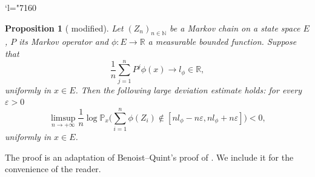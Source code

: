 \documentclass[JEP,XML,SOM,Unicode,published]{cedram}
\newcommand{\Changel}{\mathcode`l="7160}
\let\epsilon\varepsilon
\let\ts\textstyle
\theoremstyle{plain}
\newtheorem{proposition}[theorem]{Proposition}
\theoremstyle{definition}
\newcommand\R{\mathbb{R}}
\newcommand\p{\mathbb{P}}
\newcommand\N{\mathbb{N}}
\begin{document}
\Changel
\begin{proposition}[{\cite[Prop.\,3.1]{BQ.CLT} modified}]\label{proposition.deviations.MC}
Let $(Z_n)_{n\in \N}$ be a Markov chain on a state space $E$, $P$ its Markov operator and $\phi: E\to \R$ a measurable bounded function. Suppose that\vspace*{-3pt}
\begin{equation}\label{uniform}\frac{1}{n}\sum_{j=1}^n{P^j\phi(x)}\to l_{\phi}\in \R,\end{equation} uniformly in $x\in E$. Then the following large deviation estimate holds: for every $\epsilon>0$
\[
\limsup_{n\to +\infty}\frac{1}{n}\log \p_x \bigl(\ts
\sum_{i=1}^n\phi(Z_i) \not\in [nl_{\phi} - n\epsilon , nl_{\phi} +n\epsilon] \bigr)<0,
\]
uniformly in $x\in E$.
\end{proposition}
The proof is an adaptation of Benoist--Quint's proof of \cite[Prop.\,3.1]{BQ.CLT}. We include it for the convenience of the reader.
\end{document}
